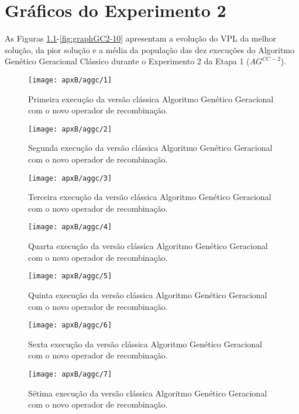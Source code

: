 \chapter{Gráficos do Experimento 2}
As Figuras \ref{fig:graphGC2-01}-\ref{fig:graphGC2-10} apresentam a evolução do VPL da melhor solução, da pior solução e a média da população das dez execuções do Algoritmo Genético Geracional Clássico durante o Experimento 2 da Etapa 1 ($AG^{CC-2}$).

\begin{figure}[H]
\centering
\texttt{[image: apxB/aggc/1]}
\caption{Primeira execução da versão clássica Algoritmo Genético Geracional com o novo operador de recombinação.}
\label{fig:graphGC2-01}
\end{figure}

\begin{figure}[H]
\centering
\texttt{[image: apxB/aggc/2]}
\caption{Segunda execução da versão clássica Algoritmo Genético Geracional com o novo operador de recombinação.}
\label{fig:graphGC2-02}
\end{figure}

\begin{figure}[H]
\centering
\texttt{[image: apxB/aggc/3]}
\caption{Terceira execução da versão clássica Algoritmo Genético Geracional com o novo operador de recombinação.}
\label{fig:graphGC2-03}
\end{figure}

\begin{figure}[H]
\centering
\texttt{[image: apxB/aggc/4]}
\caption{Quarta execução da versão clássica Algoritmo Genético Geracional com o novo operador de recombinação.}
\label{fig:graphGC2-04}
\end{figure}

\begin{figure}[H]
\centering
\texttt{[image: apxB/aggc/5]}
\caption{Quinta execução da versão clássica Algoritmo Genético Geracional com o novo operador de recombinação.}
\label{fig:graphGC2-05}
\end{figure}

\begin{figure}[H]
\centering
\texttt{[image: apxB/aggc/6]}
\caption{Sexta execução da versão clássica Algoritmo Genético Geracional com o novo operador de recombinação.}
\label{fig:graphGC2-06}
\end{figure}

\begin{figure}[H]
\centering
\texttt{[image: apxB/aggc/7]}
\caption{Sétima execução da versão clássica Algoritmo Genético Geracional com o novo operador de recombinação.}
\label{fig:graphGC2-07}
\end{figure}

